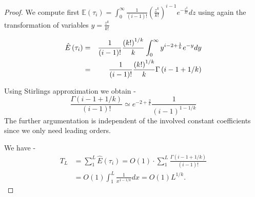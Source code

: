 \begin{proof}
We compute first $\mathbb{E}\left( \tau _{i}\right)
=\int_{0}^{\infty }\frac{1}{\left( i-1\right) !}\left( \frac{z^{k}}{k!}%
\right) ^{i-1}e^{-\frac{z^{k}}{k!}}dz$ using again the transformation of
variables $y=\frac{z^{k}}{k!}$

\begin{eqnarray}
\hat E \left( \tau _{i}\right) &=&\frac{1}{\left( i-1\right) !}\frac{\left( k!\right) ^{1/k}}{%
k}\int_{0}^{\infty }y^{i-2+\frac{1}{k}}e^{-y}dy \\
&=&\frac{1}{\left( i-1\right) !}\frac{\left( k!\right) ^{1/k}}{k}\Gamma
\left( i-1+1/k\right)
\end{eqnarray}



Using Stirlings approximation we obtain - \\
\begin{equation}
\frac{\Gamma \left( i-1+1/k\right) }{\left( i-1\right) !}\simeq e^{-2+\frac{2%
}{k}}\frac{1}{\left( i-1\right) ^{1-1/k}}
\end{equation}
The further argumentation is independent of the involved constant
coefficients since we only need leading orders.

We have -  
\begin{equation}
\begin{aligned} T_{L}&=\sum_{1}^{L}\hat E \left( \tau _{i}\right)
=O\left( 1\right) \cdot \sum_{1}^{L}\frac{\Gamma \left( i-1+1/k\right)
}{\left( i-1\right) !}\\&=O\left( 1\right)
\int_{1}^{L}\frac{1}{x^{1-1/k}}dx= O\left( 1\right) L^{1/k}. \end{aligned}
\end{equation}


\end{proof}
